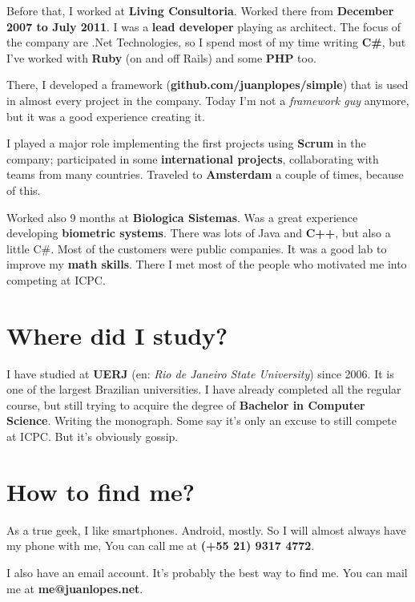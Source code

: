 \documentclass[a4paper,12pt,notitlepage]{article}
\begin{document}
	Before that, I worked at \textbf{Living Consultoria}. Worked there from \textbf{December 2007 to July 2011}. I was a \textbf{lead developer} playing as architect. The focus of the company are .Net Technologies, so I spend most of my time writing \textbf{C\#}, but I've worked with \textbf{Ruby} (on and off Rails) and some \textbf{PHP} too. 
	
	There, I developed a framework (\textbf{github.com/juanplopes/simple}) that is used in almost every project in the company. Today I'm not a \emph{framework guy} anymore, but it was a good experience creating it. 
	
	I played a major role implementing the first projects using \textbf{Scrum} in the company; participated in some \textbf{international projects}, collaborating with teams from many countries. Traveled to \textbf{Amsterdam} a couple of times, because of this.
	
	Worked also 9 months at \textbf{Biologica Sistemas}. Was a great experience developing \textbf{biometric systems}. There was lots of Java and \textbf{C++}, but also a little C\#. Most of the customers were public companies. It was a good lab to improve my \textbf{math skills}. There I met most of the people who motivated me into competing at ICPC.

\section{Where did I study?}

	I have studied at \textbf{UERJ} (en: \emph{Rio de Janeiro State University}) since 2006. It is one of the largest Brazilian universities. I have already completed all the regular course, but still trying to acquire the degree of \textbf{Bachelor in Computer Science}. Writing the monograph. Some say it’s only an excuse to still compete at ICPC. But it’s obviously gossip.

\section{How to find me?}

	As a true geek, I like smartphones. Android, mostly. So I will almost always have my phone with me, You can call me at \textbf{(+55 21) 9317 4772}.
	
	I also have an email account. It’s probably the best way to find me. You can mail me at \textbf{me@juanlopes.net}.
\end{document}
